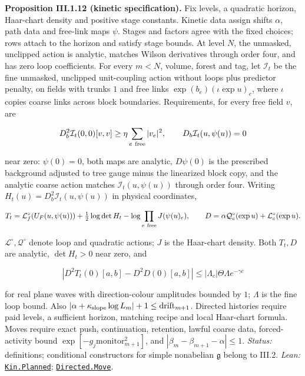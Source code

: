 \documentclass[
  letterpaper,
  11pt]{article}
\begin{document}
\textbf{Proposition III.1.12 (kinetic specification).} Fix levels, a
quadratic horizon, Haar-chart density and positive stage constants.
Kinetic data assign shifts \(\alpha\), path data and free-link maps
\(\psi\). Stages and factors agree with the fixed choices; rows attach
to the horizon and satisfy stage bounds. At level \(N\), the unmasked,
unclipped action is analytic, matches Wilson derivatives through order
four, and has zero loop coefficients. For every \(m<N\), volume, forest
and tag, let \(\mathcal I_t\) be the fine unmasked, unclipped
unit-coupling action without loops plus predictor penalty, on fields
with trunks \(1\) and free links \(\exp(b_e)(\iota\exp u)_e\), where
\(\iota\) copies coarse links across block boundaries. Requirements, for
every free field \(v\), are

\[D_b^2\mathcal I_t(0,0)[v,v]\ge\eta\sum_{e\ {\rm free}}|v_e|^2,\qquad D_b\mathcal I_t(u,\psi(u))=0\]

near zero: \(\psi(0)=0\), both maps are analytic, \(D\psi(0)\) is the
prescribed background adjusted to tree gauge minus the linearized block
copy, and the analytic coarse action matches \(\mathcal I_t(u,\psi(u))\)
through order four. Writing \(H_t(u)=D_b^2\mathcal I_t(u,\psi(u))\) in
physical coordinates,

\[T_t=\mathcal L_f^\circ(U_F(u,\psi(u)))+\tfrac12\log\det H_t-\log\prod_{e\ {\rm free}}J(\psi(u)_e),\qquad D=\alpha\mathcal Q_c^\circ(\exp u)+\mathcal L_c^\circ(\exp u).\]

\(\mathcal L^\circ,\mathcal Q^\circ\) denote loop and quadratic actions;
\(J\) is the Haar-chart density. Both \(T_t,D\) are analytic,
\(\det H_t>0\) near zero, and

\[|D^2T_t(0)[a,b]-D^2D(0)[a,b]|\le|\Lambda_c|\Theta\Lambda e^{-\gamma c}\]

for real plane waves with direction-colour amplitudes bounded by \(1\);
\(\Lambda\) is the fine loop bound. Also
\(|\alpha+\kappa_{\rm slope}\log L_m|+1\le\mathrm{drift}_{m+1}\).
Directed histories require paid levels, a sufficient horizon, matching
recipe and local Haar-chart formula. Moves require exact push,
continuation, retention, lawful coarse data, forced-activity bound
\(\exp[-g_j\mathrm{monitor}_{m+1}^2]\), and
\(|\beta_m-\beta_{m+1}-\alpha|\le1\). \emph{Status:} definitions;
conditional constructors for simple nonabelian \(\mathfrak g\) belong to
III.2. \emph{Lean:}
\href{https://github.com/yang-mills-group/OpenAI-YM-20261028/blob/3456e5e75cf8d4cd558955a5c7638fba2d68f464/YM/PCalc/Loop.lean\#L93-L115}{\texttt{Kin.Planned}};
\href{https://github.com/yang-mills-group/OpenAI-YM-20261028/blob/3456e5e75cf8d4cd558955a5c7638fba2d68f464/YM/PCalc/Band.lean\#L49-L55}{\texttt{Directed.Move}}.
\end{document}
